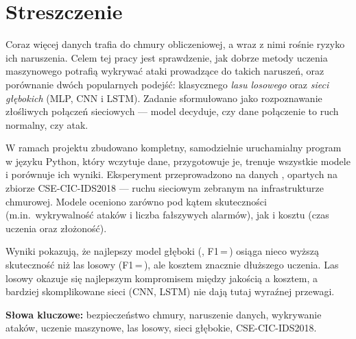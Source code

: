 \section*{Streszczenie}

Coraz więcej danych trafia do chmury obliczeniowej, a wraz z nimi rośnie ryzyko
ich naruszenia. Celem tej pracy jest sprawdzenie, jak dobrze metody uczenia
maszynowego potrafią wykrywać ataki prowadzące do takich naruszeń, oraz
porównanie dwóch popularnych podejść: klasycznego \emph{lasu losowego} oraz
\emph{sieci głębokich} (MLP, CNN i LSTM). Zadanie sformułowano jako rozpoznawanie
złośliwych połączeń sieciowych --- model decyduje, czy dane połączenie to ruch
normalny, czy atak.

W ramach projektu zbudowano kompletny, samodzielnie uruchamialny program w
języku Python, który wczytuje dane, przygotowuje je, trenuje wszystkie modele i
porównuje ich wyniki. Eksperyment przeprowadzono na danych \texttt{\resDataSource},
opartych na zbiorze CSE-CIC-IDS2018 --- ruchu sieciowym zebranym na
infrastrukturze chmurowej. Modele oceniono zarówno pod kątem skuteczności
(m.in.\ wykrywalność ataków i liczba fałszywych alarmów), jak i kosztu (czas
uczenia oraz złożoność).

Wyniki pokazują, że najlepszy model głęboki (\resBestDeepModel,
F1\,=\,\resBestDeepFOne) osiąga nieco wyższą skuteczność niż las losowy
(F1\,=\,\resRFFOne), ale kosztem znacznie dłuższego uczenia. Las losowy okazuje
się najlepszym kompromisem między jakością a kosztem, a bardziej skomplikowane
sieci (CNN, LSTM) nie dają tutaj wyraźnej przewagi.

\medskip
\noindent\textbf{Słowa kluczowe:} bezpieczeństwo chmury, naruszenie danych,
wykrywanie ataków, uczenie maszynowe, las losowy, sieci głębokie,
CSE-CIC-IDS2018.
